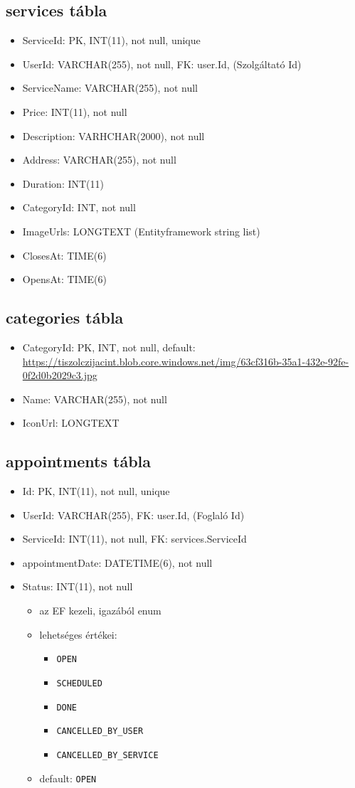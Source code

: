 \documentclass[11pt]{article}
\begin{document}
\subsection{services tábla}
\label{sec:org9693865}
\begin{itemize}
\item ServiceId: PK, INT(11), not null, unique
\item UserId: VARCHAR(255), not null, FK: user.Id, (Szolgáltató Id)
\item ServiceName: VARCHAR(255), not null
\item Price: INT(11), not null
\item Description: VARHCHAR(2000), not null
\item Address: VARCHAR(255), not null
\item Duration: INT(11)
\item CategoryId: INT, not null
\item ImageUrls: LONGTEXT (Entityframework string list)
\item ClosesAt: TIME(6)
\item OpensAt: TIME(6)
\end{itemize}
\subsection{categories tábla}
\label{sec:org1d098e2}
\begin{itemize}
\item CategoryId: PK, INT, not null, default: \url{https://tiszolczijacint.blob.core.windows.net/img/63cf316b-35a1-432e-92fe-0f2d0b2029c3.jpg}
\item Name: VARCHAR(255), not null
\item IconUrl: LONGTEXT
\end{itemize}
\subsection{appointments tábla}
\label{sec:orgf2006eb}
\begin{itemize}
\item Id:  PK, INT(11), not null, unique
\item UserId: VARCHAR(255), FK: user.Id, (Foglaló Id)
\item ServiceId: INT(11), not null, FK: services.ServiceId
\item appointmentDate: DATETIME(6), not null
\item Status: INT(11), not null
\begin{itemize}
\item az EF kezeli, igazából enum
\item lehetséges értékei:
\begin{itemize}
\item \texttt{OPEN}
\item \texttt{SCHEDULED}
\item \texttt{DONE}
\item \texttt{CANCELLED\_BY\_USER}
\item \texttt{CANCELLED\_BY\_SERVICE}
\end{itemize}
\item default: \texttt{OPEN}
\end{itemize}
\end{itemize}
\end{document}

